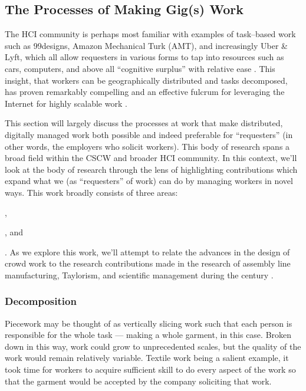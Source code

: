 \documentclass{sigchi}
\begin{document}

\subsection{The Processes of Making Gig(s) Work}\label{sec:MakingGigsWork}

The HCI community is perhaps most familiar with examples of task--based work such as
99designs,
Amazon Mechanical Turk (AMT),
and increasingly
Uber \& Lyft,
which all allow requesters in various forms to tap into
resources such as
cars,
computers, and above all
``cognitive surplus''
with relative ease
\cite{howe2006rise,DillahuntPromise,storiesIraniSilberman,shirky2010cognitive}.
This insight, that
workers can be geographically distributed and tasks decomposed,
has proven remarkably compelling
and an effective fulcrum for leveraging the Internet for highly scalable work
\cite{sensitiveTasks,embracingErrorKrishna}.


This section will largely discuss the processes at work that make distributed,
digitally managed work both possible and indeed preferable for ``requesters''
(in other words, the employers who solicit workers).
This body of research spans a broad field
within the CSCW and broader HCI community.
In this context,
we'll look at the body of research through the lens of
highlighting contributions which expand what we
(as ``requesters'' of work) can do by managing workers in novel ways.
This work broadly consists of three areas:
\begin{inlinelist}
\item {},
\item {}, and
\item {}
\end{inlinelist}.
As we explore this work, we'll
attempt to relate the advances in the design of crowd work to
the research contributions made in the research of assembly line manufacturing,
Taylorism, and
scientific management 
during the  century
\cite{hu1961parallel}.


\subsubsection{Decomposition}\label{sec:decomposition}
Piecework may be thought of as vertically slicing work such that 
each person is responsible for the whole task
--- making a whole garment, in this case.
Broken down in this way, work could grow to unprecedented scales,
but the quality of the work would remain relatively variable.
Textile work being a salient example,
it took time for workers to acquire sufficient skill
to do every aspect of the work so that the garment would be accepted by the company soliciting that work.
\end{document}
